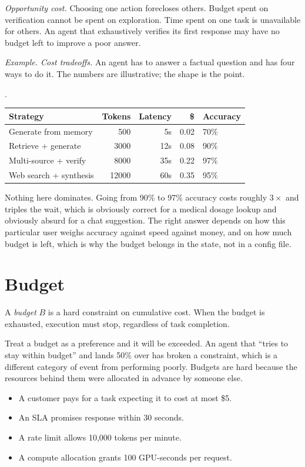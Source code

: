 \textit{Opportunity cost.} Choosing one action forecloses others. Budget spent on verification cannot be spent on exploration. Time spent on one task is unavailable for others. An agent that exhaustively verifies its first response may have no budget left to improve a poor answer.

\textit{Example. Cost tradeoffs.} An agent has to answer a factual question and has four ways to do it. The numbers are illustrative; the shape is the point.

\begin{center}.
\begin{tabular}{lrrrl}
\toprule
Strategy & Tokens & Latency & \$ & Accuracy \\
\midrule
Generate from memory & 500 & 5s & 0.02 & 70\% \\
Retrieve + generate & 3000 & 12s & 0.08 & 90\% \\
Multi-source + verify & 8000 & 35s & 0.22 & 97\% \\
Web search + synthesis & 12000 & 60s & 0.35 & 95\% \\
\bottomrule
\end{tabular}
\end{center}

Nothing here dominates. Going from 90\% to 97\% accuracy costs roughly $3\times$ and triples the wait, which is obviously correct for a medical dosage lookup and obviously absurd for a chat suggestion. The right answer depends on how this particular user weighs accuracy against speed against money, and on how much budget is left, which is why the budget belongs in the state, not in a config file.

\section{Budget}

A \emph{budget} $B$ is a hard constraint on cumulative cost. When the budget is exhausted, execution must stop, regardless of task completion.

Treat a budget as a preference and it will be exceeded. An agent that ``tries to stay within budget'' and lands 50\% over has broken a constraint, which is a different category of event from performing poorly. Budgets are hard because the resources behind them were allocated in advance by someone else.

\begin{itemize}
\item A customer pays for a task expecting it to cost at most \$5.
\item An SLA promises response within 30 seconds.
\item A rate limit allows 10,000 tokens per minute.
\item A compute allocation grants 100 GPU-seconds per request.
\end{itemize}

